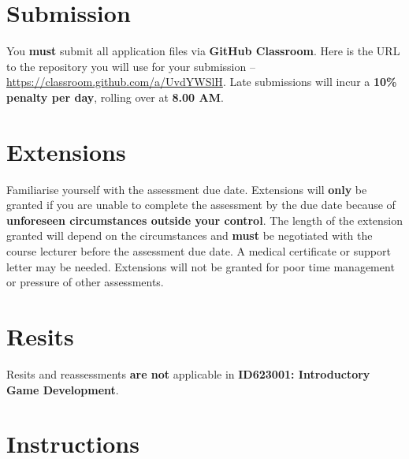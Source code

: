 \documentclass{article}
\begin{document}
\section*{Submission}
You \textbf{must} submit all application files via \textbf{GitHub Classroom}. Here is the URL to the repository you will use for your submission – \href{https://classroom.github.com/a/UvdYWSlH}{https://classroom.github.com/a/UvdYWSlH}. Late submissions will incur a \textbf{10\% penalty per day}, rolling over at \textbf{8.00 AM}. 

\section*{Extensions}
Familiarise yourself with the assessment due date. Extensions will \textbf{only} be granted if you are unable to complete the assessment by the due date because of \textbf{unforeseen circumstances outside your control}. The length of the extension granted will depend on the circumstances and \textbf{must} be negotiated with the course lecturer before the assessment due date. A medical certificate or support letter may be needed. Extensions will not be granted for poor time management or pressure of other assessments.

\section*{Resits}
Resits and reassessments \textbf{are not} applicable in \textbf{ID623001: Introductory Game Development}.

\section*{Instructions}
\end{document}
